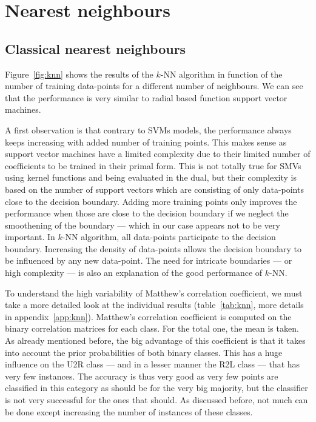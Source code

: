 \section{Nearest neighbours}
\subsection{Classical nearest neighbours}
Figure~\ref{fig:knn} shows the results of the $k$-NN algorithm in function of the number of training data-points for a different number of neighbours. We can see that the performance is very similar to radial based function support vector machines.

A first observation is that contrary to SVMs models, the performance always keeps increasing with added number of training points. This makes sense as support vector machines have a limited complexity due to their limited number of coefficients to be trained in their primal form. This is not totally true for SMVs using kernel functions and being evaluated in the dual, but their complexity is based on the number of support vectors which are consisting of only data-points close to the decision boundary. Adding more training points only improves the performance when those are close to the decision boundary if we neglect the smoothening of the boundary --- which in our case appears not to be very important. In $k$-NN algorithm, all data-points participate to the decision boundary. Increasing the density of data-points allows the decision boundary to be influenced by any new data-point. The need for intricate boundaries --- or high complexity --- is also an explanation of the good performance of $k$-NN.

To understand the high variability of Matthew's correlation coefficient, we must take a more detailed look at the individual results (table~\ref{tab:knn}, more details in appendix~\ref{app:knn}). Matthew's correlation coefficient is computed on the binary correlation matrices for each class. For the total one, the mean is taken. As already mentioned before, the big advantage of this coefficient is that it takes into account the prior probabilities of both binary classes. This has a huge influence on the U2R class --- and in a lesser manner the R2L class --- that has very few instances. The accuracy is thus very good as very few points are classified in this category as should be for the very big majority, but the classifier is not very successful for the ones that should. As discussed before, not much can be done except increasing the number of instances of these classes.

